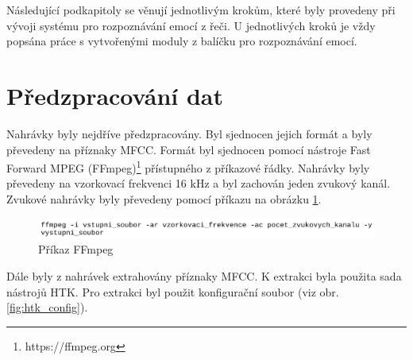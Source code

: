 \documentclass[FM,BP]{tulthesis}
\begin{document}
Následující podkapitoly se věnují jednotlivým krokům, které byly provedeny při vývoji systému pro rozpoznávání emocí z řeči. U jednotlivých kroků je vždy popsána práce s vytvořenými moduly z balíčku pro rozpoznávání emocí.

\section{Předzpracování dat} %
Nahrávky byly nejdříve předzpracovány. Byl sjednocen jejich formát a byly převedeny na příznaky MFCC. Formát byl sjednocen pomocí nástroje Fast Forward MPEG (FFmpeg)\footnote{https://ffmpeg.org} přístupného z příkazové řádky. Nahrávky byly převedeny na vzorkovací frekvenci 16 kHz a byl zachován jeden zvukový kanál. Zvukové nahrávky byly převedeny pomocí příkazu na obrázku \mbox{\ref{fig:ffmpeg}}.

\begin{figure}[htbp]
\centerline{\includegraphics[width=\textwidth,height=\textheight,keepaspectratio]{ffmpeg_command.png}}
\caption{Příkaz FFmpeg}
\label{fig:ffmpeg}
\end{figure}
\FloatBarrier

Dále byly z nahrávek extrahovány příznaky MFCC. K extrakci byla použita sada nástrojů HTK. Pro extrakci byl použit konfigurační soubor (viz obr. \mbox{\ref{fig:htk_config})}.
\end{document}
